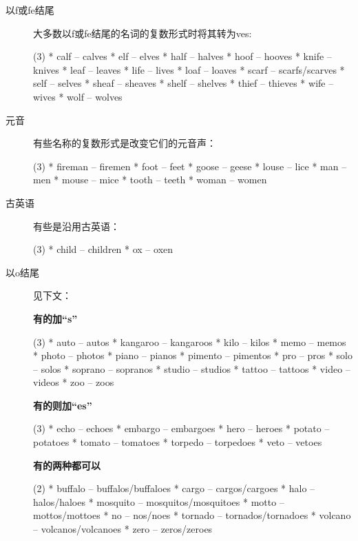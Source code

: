 \begin{description}
\item[以f或fe结尾] 大多数以f或fe结尾的名词的复数形式时将其转为ves:
  \begin{taskitem}(3)
    *  calf -- calves
    *  elf -- elves
    *  half -- halves
    *  hoof -- hooves
    *  knife -- knives
    *  leaf -- leaves
    *  life -- lives
    *  loaf -- loaves
    *  scarf -- scarfs/scarves
    *  self -- selves
    *  sheaf -- sheaves
    *  shelf -- shelves
    *  thief -- thieves
    *  wife -- wives
    *  wolf -- wolves
  \end{taskitem}

\item[元音] 有些名称的复数形式是改变它们的元音声：
  \begin{taskitem}(3)
    *  fireman -- firemen
    *  foot -- feet
    *  goose -- geese
    *  louse -- lice
    *  man -- men
    *  mouse -- mice
    *  tooth -- teeth
    *  woman -- women
  \end{taskitem}


\item[古英语] 有些是沿用古英语：
  \begin{taskitem}(3)
    *  child -- children
    *  ox -- oxen
  \end{taskitem}


\item[以o结尾] 见下文：

  \textbf{有的加``s''}

  \begin{taskitem}(3)
    *  auto -- autos
    *  kangaroo -- kangaroos
    *  kilo -- kilos
    *  memo -- memos
    *  photo -- photos
    *  piano -- pianos
    *  pimento -- pimentos
    *  pro -- pros
    *  solo -- solos
    *  soprano -- sopranos
    *  studio -- studios
    *  tattoo -- tattoos
    *  video -- videos
    *  zoo -- zoos
  \end{taskitem}

  \textbf{有的则加``es''}

  \begin{taskitem}(3)
    *  echo -- echoes
    *  embargo -- embargoes
    *  hero -- heroes
    *  potato -- potatoes
    *  tomato -- tomatoes
    *  torpedo -- torpedoes
    *  veto -- vetoes
  \end{taskitem}

  \textbf{有的两种都可以}
  \begin{taskitem}(2)
    *  buffalo -- buffalos/buffaloes
    *  cargo -- cargos/cargoes
    *  halo -- halos/haloes
    *  mosquito -- mosquitos/mosquitoes
    *  motto -- mottos/mottoes
    *  no -- nos/noes
    *  tornado -- tornados/tornadoes
    *  volcano -- volcanos/volcanoes
    *  zero -- zeros/zeroes
  \end{taskitem}


\end{description}
